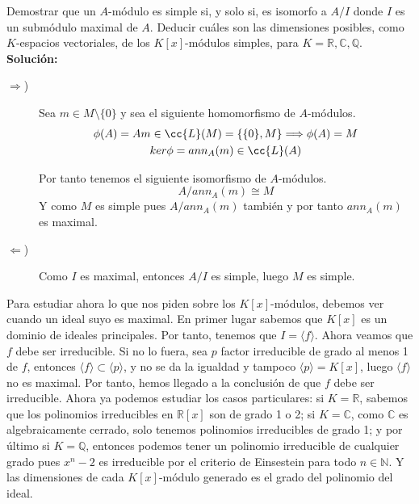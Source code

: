 \begin{ejercicio}\label{eje19}
    Demostrar que un $A$-módulo es simple si, y solo si, es isomorfo a $A/I$ donde $I$ es un submódulo maximal de $A$. Deducir cuáles son las dimensiones posibles, como $K$-espacios vectoriales, de los $K[x]$-módulos simples, para $K=\mathbb{R},\mathbb{C},\mathbb{Q}$. \\
    
    \noindent
    \textbf{Solución:}
    \begin{description}
        \item [$\Longrightarrow$)] Sea $m \in M \setminus \{0\}$ y sea el siguiente homomorfismo de $A$-módulos. 
        \begin{gather*}
            \phi(A) = Am \in \cc{L}(M) = \{\{0\}, M\} \Longrightarrow \phi(A) = M \\
            ker\phi = ann_A(m) \in \cc{L}(A)
        \end{gather*}

        Por tanto tenemos el siguiente isomorfismo de $A$-módulos.
        \begin{equation*}
            A/ann_A(m) \cong M
        \end{equation*}
        Y como $M$ es simple pues $A/ann_A(m)$ también y por tanto $ann_A(m)$ es maximal.
        \item [$\Longleftarrow$)] Como $I$ es maximal, entonces $A/I$ es simple, luego $M$ es simple. 
    \end{description}

    Para estudiar ahora lo que nos piden sobre los $K[x]$-módulos, debemos ver cuando un ideal suyo es maximal. En primer lugar sabemos que $K[x]$ es un dominio de ideales principales. Por tanto, tenemos que $I = \langle f \rangle$. Ahora veamos que $f$ debe ser irreducible. Si no lo fuera, sea $p$ factor irreducible de grado al menos 1 de $f$, entonces $\langle f \rangle \subset \langle p \rangle$, y no se da la igualdad y tampoco $\langle p \rangle = K[x]$, luego $\langle f \rangle$ no es maximal. Por tanto, hemos llegado a la conclusión de que $f$ debe ser irreducible. Ahora ya podemos estudiar los casos particulares: si $K = \mathbb{R}$, sabemos que los polinomios irreducibles en $\mathbb{R}[x]$ son de grado 1 o 2; si $K=\mathbb{C}$, como $\mathbb{C}$ es algebraicamente cerrado, solo tenemos polinomios irreducibles de grado 1; y por último si $K=\mathbb{Q}$, entonces podemos tener un polinomio irreducible de cualquier grado pues $x^n-2$ es irreducible por el criterio de Einsestein para todo $n \in \mathbb{N}$. 
    Y las dimensiones de cada $K[x]$-módulo generado es el grado del polinomio del ideal.
\end{ejercicio}


